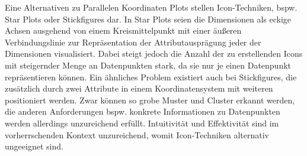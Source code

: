 \documentclass[usegeometry=true]{scrartcl}
\begin{document}
Eine Alternativen zu Parallelen Koordinaten Plots stellen Icon-Techniken, bspw. Star Plots oder Stickfigures dar.
In Star Plots seien die Dimensionen als eckige Achsen ausgehend von einem Kreismittelpunkt mit einer äußeren Verbindungslinie zur Repräsentation der Attributausprägung jeder der Dimensionen visualisiert.
Dabei steigt jedoch die Anzahl der zu erstellenden Icons mit steigernder Menge an Datenpunkten stark, da sie nur je einen Datenpunkt repräsentieren können.\cite[20]{Chan.2006}
Ein ähnliches Problem existiert auch bei Stickfigures, die zusätzlich durch zwei Attribute in einem Koordinatensystem mit weiteren positioniert werden.
Zwar können so grobe Muster und Cluster erkannt werden, die anderen Anforderungen bspw. konkrete Informationen zu Datenpunkten werden allerdings unzureichend erfüllt.
Intuitivität und Effektivität sind im vorherrschenden Kontext unzureichend, womit Icon-Techniken alternativ ungeeignet sind. 




\end{document}
